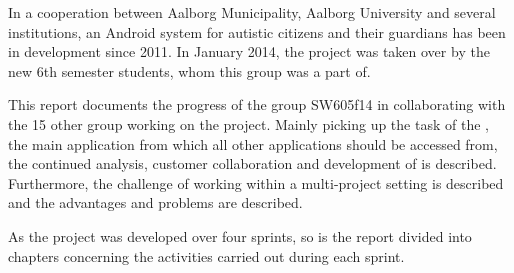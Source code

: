 In a cooperation between Aalborg Municipality, Aalborg University and several institutions, an Android system for autistic citizens and their guardians has been in development since 2011.
In January 2014, the project was taken over by the new 6th semester students, whom this group was a part of.

This report documents the progress of the group SW605f14 in collaborating with the 15 other group working on the project.
Mainly picking up the task of the \launcher, the main application from which all other applications should be accessed from, the continued analysis, customer collaboration and development of is described.
Furthermore, the challenge of working within a multi-project setting is described and the advantages and problems are described.

As the project was developed over four sprints, so is the report divided into chapters concerning the activities carried out during each sprint.